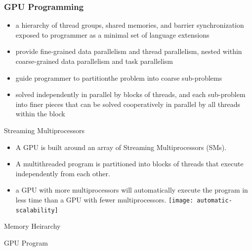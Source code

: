 \documentclass[10pt,t]{beamer}
\begin{document}
\begin{frame}
  \frametitle{GPU Programming}
  \begin{itemize}
  \item a hierarchy of thread groups, shared memories, and barrier synchronization exposed to programmer as a minimal set of language extensions
  \item provide fine-grained data parallelism and thread parallelism, nested within coarse-grained data parallelism and task parallelism
  \item guide programmer to partitionthe problem into coarse sub-problems 
  \item solved independently in parallel by blocks of threads, and each sub-problem into finer pieces that can be solved cooperatively in parallel by all threads within the block
  \end{itemize}
\end{frame}

\begin{frame}{Streaming Multiprocessors}
  \begin{itemize}
  \item A GPU is built around an array of Streaming Multiprocessors (SMs). 
  \item A multithreaded program is partitioned into blocks of threads that execute independently from each other. 
  \item a GPU with more multiprocessors will automatically execute the program in less time than a GPU with fewer multiprocessors.
    \texttt{[image: automatic-scalability]}
  \end{itemize}
\end{frame}

\begin{frame}{Memory Heirarchy}
\end{frame}

\begin{frame}{GPU Program}
\end{frame}
\end{document}
